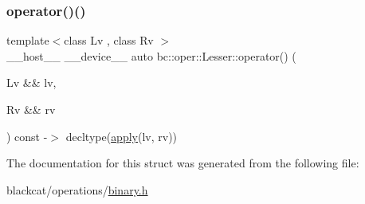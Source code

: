 \mbox{\label{structbc_1_1oper_1_1Lesser_a721284f1f0fc95248cf7e18c2666f3d9}} 
\subsubsection{\texorpdfstring{operator()()}{operator()()}}
{\footnotesize\ttfamily template$<$class Lv , class Rv $>$ \\
\+\_\+\+\_\+host\+\_\+\+\_\+ \+\_\+\+\_\+device\+\_\+\+\_\+ auto bc\+::oper\+::\+Lesser\+::operator() (\begin{DoxyParamCaption}\item[{Lv \&\&}]{lv,  }\item[{Rv \&\&}]{rv }\end{DoxyParamCaption}) const -\/$>$ decltype(\hyperlink{structbc_1_1oper_1_1Lesser_aac961b96c6338178a9bfef611ce4b794}{apply}(lv, rv)) \hspace{0.3cm}{\ttfamily [inline]}}



The documentation for this struct was generated from the following file\+:\begin{DoxyCompactItemize}
\item 
blackcat/operations/\hyperlink{binary_8h}{binary.\+h}\end{DoxyCompactItemize}
